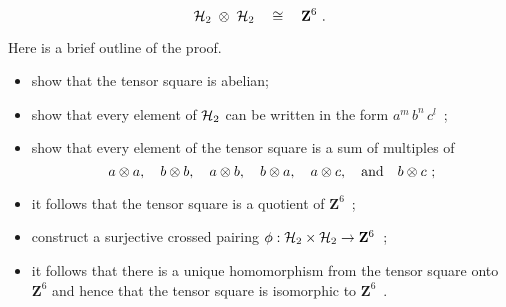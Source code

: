 \begin{prop}
$$
\mathcal{H}_2 \;\otimes\; \mathcal{H}_2 \quad\cong\quad \mathbf{Z}^6~.
$$
\end{prop}
\begin{pf}
Here is a brief outline of the proof.
\begin{itemize}
\item
show that the tensor square is abelian;
\item
show that every element of  $\mathcal{H}_2$ can be written in the form
$a^m\,b^n\,c^l$~;
\item
show that every element of the tensor square is a sum of multiples of
$$
a \otimes a,\quad
b \otimes b,\quad
a \otimes b,\quad
b \otimes a,\quad
a \otimes c,\quad \mbox{and}\quad
b \otimes c~;
$$
\item
it follows that the tensor square is a quotient of $\mathbf{Z}^6$~;
\item
construct a surjective crossed pairing  
$\phi : \mathcal{H}_2 \times \mathcal{H}_2 \to \mathbf{Z}^6$~;
\item
it follows that there is a unique homomorphism from the tensor square
onto $\mathbf{Z}^6$  and hence that the tensor square is isomorphic
to $\mathbf{Z}^6$~.
\end{itemize}
\end{pf}
